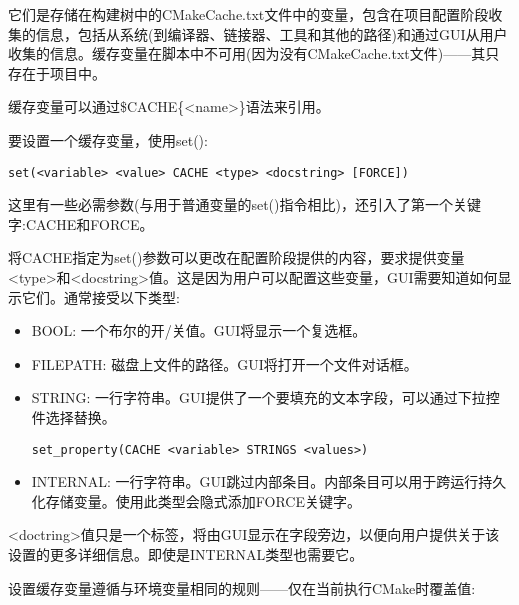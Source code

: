 

它们是存储在构建树中的CMakeCache.txt文件中的变量，包含在项目配置阶段收集的信息，包括从系统(到编译器、链接器、工具和其他的路径)和通过GUI从用户收集的信息。缓存变量在脚本中不可用(因为没有CMakeCache.txt文件)——其只存在于项目中。

缓存变量可以通过\$CACHE\{<name>\}语法来引用。

要设置一个缓存变量，使用set():

\begin{lstlisting}[style=styleCMake]
set(<variable> <value> CACHE <type> <docstring> [FORCE]) 
\end{lstlisting}

这里有一些必需参数(与用于普通变量的set()指令相比)，还引入了第一个关键字:CACHE和FORCE。

将CACHE指定为set()参数可以更改在配置阶段提供的内容，要求提供变量<type>和<docstring>值。这是因为用户可以配置这些变量，GUI需要知道如何显示它们。通常接受以下类型:

\begin{itemize}
\item 
BOOL: 一个布尔的开/关值。GUI将显示一个复选框。

\item 
FILEPATH: 磁盘上文件的路径。GUI将打开一个文件对话框。

\item 
STRING: 一行字符串。GUI提供了一个要填充的文本字段，可以通过下拉控件选择替换。

\begin{lstlisting}[style=styleCMake]
set_property(CACHE <variable> STRINGS <values>)
\end{lstlisting}

\item 
INTERNAL: 一行字符串。GUI跳过内部条目。内部条目可以用于跨运行持久化存储变量。使用此类型会隐式添加FORCE关键字。
\end{itemize}

<doctring>值只是一个标签，将由GUI显示在字段旁边，以便向用户提供关于该设置的更多详细信息。即使是INTERNAL类型也需要它。

设置缓存变量遵循与环境变量相同的规则——仅在当前执行CMake时覆盖值:

